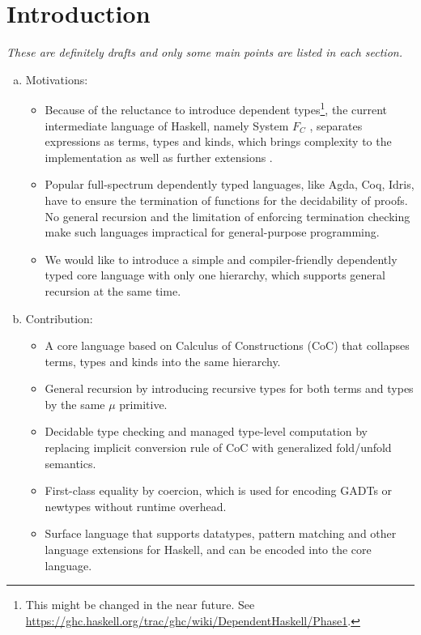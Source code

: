 \section{Introduction}
\emph{These are definitely drafts and only some main points are listed in each section.}

\begin{enumerate}[a)]
\item Motivations:

\begin{itemize}
\item Because of the reluctance to introduce dependent types\footnote{This might be changed in the near future. See \url{https://ghc.haskell.org/trac/ghc/wiki/DependentHaskell/Phase1}.}, the current intermediate language of Haskell, namely System $F_C$ \cite{fc}, separates expressions as terms, types and kinds, which brings complexity to the implementation as well as further extensions \cite{fc:pro,fc:kind}.

\item Popular full-spectrum dependently typed languages, like Agda, Coq, Idris, have to ensure the termination of functions for the decidability of proofs. No general recursion and the limitation of enforcing termination checking make such languages impractical for general-purpose programming.

\item We would like to introduce a simple and compiler-friendly dependently typed core language with only one hierarchy, which supports general recursion at the same time.
\end{itemize}

\item Contribution:
\begin{itemize}
\item A core language based on Calculus of Constructions (CoC) that collapses terms, types and kinds into the same hierarchy.
\item General recursion by introducing recursive types for both terms and types by the same $\mu$ primitive.
\item Decidable type checking and managed type-level computation by replacing implicit conversion rule of CoC with generalized \textsf{fold}/\textsf{unfold} semantics.
\item First-class equality by coercion, which is used for encoding GADTs or newtypes without runtime overhead.
\item Surface language that supports datatypes, pattern matching and other language extensions for Haskell, and can be encoded into the core language.
\end{itemize}


\end{enumerate}
